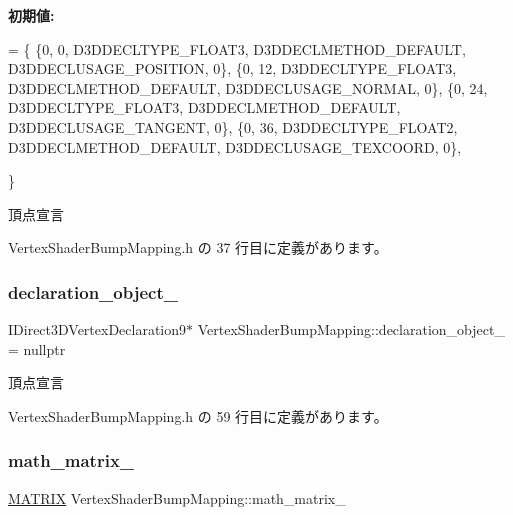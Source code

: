 {\bfseries 初期値\+:}
\begin{DoxyCode}
=
\{
    \{0,  0, D3DDECLTYPE\_FLOAT3, D3DDECLMETHOD\_DEFAULT, D3DDECLUSAGE\_POSITION, 0\},
    \{0, 12, D3DDECLTYPE\_FLOAT3, D3DDECLMETHOD\_DEFAULT, D3DDECLUSAGE\_NORMAL,   0\},
    \{0, 24, D3DDECLTYPE\_FLOAT3, D3DDECLMETHOD\_DEFAULT, D3DDECLUSAGE\_TANGENT,  0\},
    \{0, 36, D3DDECLTYPE\_FLOAT2, D3DDECLMETHOD\_DEFAULT, D3DDECLUSAGE\_TEXCOORD, 0\},

\}
\end{DoxyCode}


頂点宣言 



 Vertex\+Shader\+Bump\+Mapping.\+h の 37 行目に定義があります。

\mbox{\label{class_vertex_shader_bump_mapping_a6e45d81a2a9c8ba7071b7f2686264a49}} 
\subsubsection{\texorpdfstring{declaration\+\_\+object\+\_\+}{declaration\_object\_}}
{\footnotesize\ttfamily I\+Direct3\+D\+Vertex\+Declaration9$\ast$ Vertex\+Shader\+Bump\+Mapping\+::declaration\+\_\+object\+\_\+ = nullptr\hspace{0.3cm}{\ttfamily [private]}}



頂点宣言 



 Vertex\+Shader\+Bump\+Mapping.\+h の 59 行目に定義があります。

\mbox{\label{class_vertex_shader_bump_mapping_a2d2de356dd9f615ed927f8ff315f8ad0}} 
\subsubsection{\texorpdfstring{math\+\_\+matrix\+\_\+}{math\_matrix\_}}
{\footnotesize\ttfamily \mbox{\hyperlink{_matrix_8h_a032295cd9fb1b711757c90667278e744}{M\+A\+T\+R\+IX}} Vertex\+Shader\+Bump\+Mapping\+::math\+\_\+matrix\+\_\+\hspace{0.3cm}{\ttfamily [private]}}



